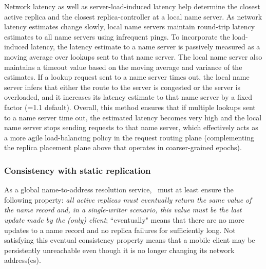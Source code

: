 Network latency as well as server-load-induced latency help determine the closest active replica and the closest replica-controller at a local name server. As network latency estimates change slowly, local name servers maintain round-trip latency estimates to all name servers using infrequent pings.  To incorporate the load-induced latency, the latency estimate to a name server is passively measured as a moving average over lookups sent to that name server. The local name server also maintains a timeout value based on the moving average and variance of the estimates.  If a lookup request sent to a name server times out, the local name server infers that either the route to the server  is congested or the server is overloaded, and it increases its latency estimate to that name server by a fixed factor (=1.1 default). Overall, this method ensures that  if multiple lookups sent to a name server time out, the estimated latency becomes very high and the local name server stops sending requests to that name  server, which effectively acts as a more agile load-balancing policy in the request routing plane (complementing the replica placement plane above that operates in coarser-grained epochs).


\subsubsection{Consistency with static replication}
\label{sec:consistency}



As a global name-to-address resolution service, \auspice\ must at least ensure the following property: {\em all active replicas must eventually return the same value of the name record and, in a single-writer scenario, this value must be the last update made by the (only) client}; ``eventually" means that there are no more updates to a name record and no replica failures for sufficiently long. Not satisfying this {eventual consistency} property means that a mobile client may be  persistently unreachable even though it is no longer changing its network address(es). 

